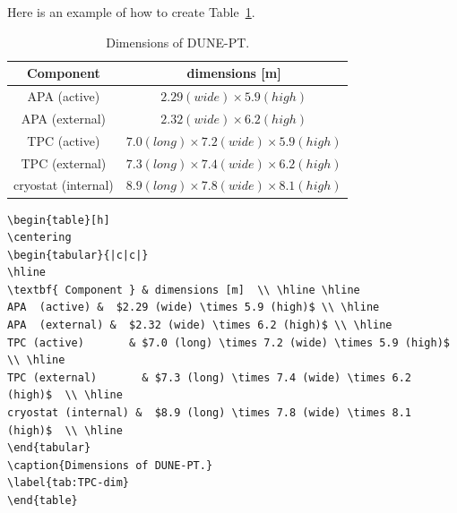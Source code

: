\newpage
Here is an example of how to create Table~\ref{tab:TPC-dim}.

\begin{table}[h]
\centering
\begin{tabular}{|c|c|}
\hline
\textbf{ Component } & dimensions [m]  \\ \hline \hline
APA  (active) &  $2.29 (wide) \times 5.9 (high)$ \\ \hline
APA  (external) &  $2.32 (wide) \times 6.2 (high)$ \\ \hline
TPC (active)       & $7.0 (long) \times 7.2 (wide) \times 5.9 (high)$  \\ \hline
TPC (external)       & $7.3 (long) \times 7.4 (wide) \times 6.2 (high)$  \\ \hline
cryostat (internal) &  $8.9 (long) \times 7.8 (wide) \times 8.1 (high)$  \\ \hline
\end{tabular}
\caption{Dimensions of DUNE-PT.}
\label{tab:TPC-dim}
\end{table}

\begin{verbatim}
\begin{table}[h]
\centering
\begin{tabular}{|c|c|}
\hline
\textbf{ Component } & dimensions [m]  \\ \hline \hline
APA  (active) &  $2.29 (wide) \times 5.9 (high)$ \\ \hline
APA  (external) &  $2.32 (wide) \times 6.2 (high)$ \\ \hline
TPC (active)       & $7.0 (long) \times 7.2 (wide) \times 5.9 (high)$  \\ \hline
TPC (external)       & $7.3 (long) \times 7.4 (wide) \times 6.2 (high)$  \\ \hline
cryostat (internal) &  $8.9 (long) \times 7.8 (wide) \times 8.1 (high)$  \\ \hline
\end{tabular}
\caption{Dimensions of DUNE-PT.}
\label{tab:TPC-dim}
\end{table}

\end{verbatim}

